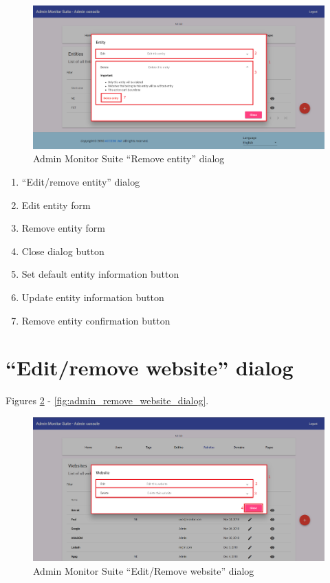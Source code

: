 \begin{figure}[H]
    \centering
    \includegraphics[width=\linewidth]{lib/images/admin/admin_remove_entity_dialog.png}
    \caption{Admin Monitor Suite ``Remove entity'' dialog}
    \label{fig:admin_remove_entity_dialog}
\end{figure}

\begin{enumerate}
    \item ``Edit/remove entity'' dialog
    \item Edit entity form
    \item Remove entity form
    \item Close dialog button
    \item Set default entity information button
    \item Update entity information button
    \item Remove entity confirmation button
\end{enumerate}

\section{``Edit/remove website'' dialog}
\label{sec:admin_edit_website_dialog}

Figures \ref{fig:admin_edit_remove_website_dialog} - \ref{fig:admin_remove_website_dialog}.

\begin{figure}[H]
    \centering
    \includegraphics[width=\linewidth]{lib/images/admin/admin_edit_remove_website_dialog.png}
    \caption{Admin Monitor Suite ``Edit/Remove website'' dialog}
    \label{fig:admin_edit_remove_website_dialog}
\end{figure}


